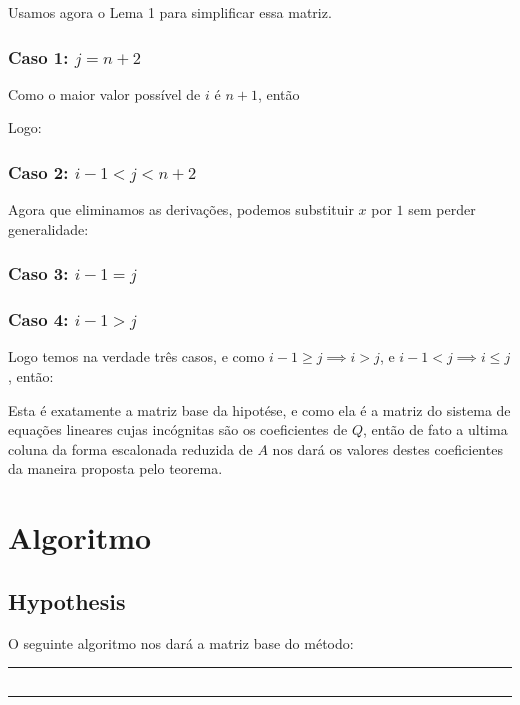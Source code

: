 \documentclass[a4paper, 10pt]{article}
\def\lang{portugues}
\begin{document}
Usamos agora o Lema 1 para simplificar essa matriz.

\pagebreak
\subsubsection{Caso 1: $j = n + 2$}

Como o maior valor poss\'ivel de $i$ \'e $n+1$, ent\~ao

\caseOneComparison

Logo:

\caseOneResult

\subsubsection{Caso 2: $i - 1 < j < n + 2$}

\caseTwoPartOne

Agora que eliminamos as deriva\c{c}\~oes, podemos substituir $x$ por $1$ sem perder generalidade:

\caseTwoPartTwo

\subsubsection{Caso 3: $i - 1 = j$}

\caseThree

\subsubsection{Caso 4: $i - 1 > j$}

\caseFour

Logo temos na verdade tr\^es casos, e como $i - 1 \geq j \implies i > j$, e $i - 1 < j \implies i \leq j$, ent\~ao:

\aijDef

Esta \'e exatamente a matriz base da hipot\'ese, e como ela \'e a matriz do sistema de equa\c{c}\~oes lineares cujas inc\'ognitas s\~ao os coeficientes de $Q$, ent\~ao de fato a ultima coluna da forma escalonada reduzida de $A$ nos dar\'a os valores destes coeficientes da maneira proposta pelo teorema.

\pagebreak
\section{Algoritmo}

\subsection{Hypothesis}
O seguinte algoritmo nos dar\'a a matriz base do m\'etodo:
\hrule
\inputminted[linenos]{code/\lang.py:AlgLexer -x}{code/\lang.alg}
\hrule
\end{document}
